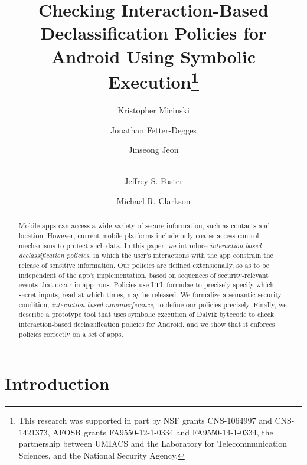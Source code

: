 \documentclass{llncs}
\begin{document}
\title{Checking Interaction-Based
  Declassification Policies for Android Using Symbolic
  Execution\thanks{This research was supported in part by NSF grants CNS-1064997 and CNS-1421373, 
AFOSR grants FA9550-12-1-0334 and FA9550-14-1-0334,
the partnership between UMIACS and the Laboratory for Telecommunication Sciences,
and the National Security Agency.}}

\author{Kristopher Micinski \and
  Jonathan Fetter-Degges \and
  Jinseong Jeon \and \\
  Jeffrey S. Foster \and
  Michael R. Clarkson}

\maketitle

\begin{abstract} 
  Mobile apps can access a wide variety of secure information, such as
  contacts and location. However, current mobile platforms include
  only coarse access control mechanisms to protect such data.  In this
  paper, we introduce \emph{interaction-based declassification
    policies}, in which the user's interactions with the app constrain
  the release of sensitive information.  Our policies are defined
  extensionally, so as to be independent of the app's implementation,
  based on sequences of security-relevant events that occur in app
  runs. Policies use LTL formulae to precisely specify which secret
  inputs, read at which times, may be released. We formalize a
  semantic security condition, \emph{interaction-based
    noninterference}, to define our policies precisely.  Finally, we
  describe a prototype tool that uses symbolic execution of Dalvik bytecode to check
  interaction-based declassification policies for Android, and we show
  that it enforces policies correctly on a set of apps.
\end{abstract}

\section{Introduction}
\label{sec:introduction}
\end{document}
